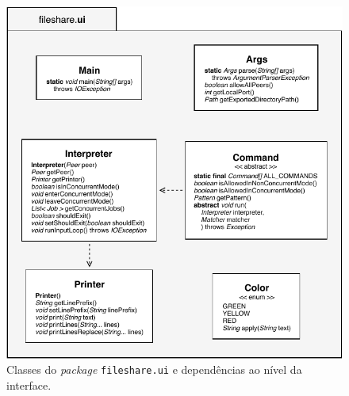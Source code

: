 \begin{figure}[ht]
  \centering
  \includegraphics{figures/classes-ui.pdf}
  \caption{Classes do \emph{package} \texttt{fileshare.ui} e dependências ao nível da interface.}
  \label{fig:impl:classes-ui}
\end{figure}

